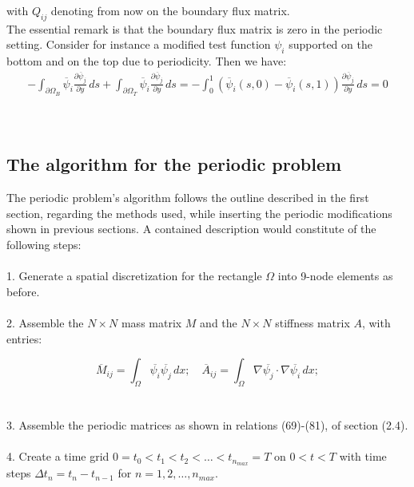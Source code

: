 \documentclass{article}
\begin{document}
with $Q_{ij}$ denoting from now on the boundary flux matrix.\\

The essential remark is that the boundary flux matrix is zero in the periodic setting. Consider for instance a modified test function $\psi_i$ supported on the bottom and on the top due to periodicity. Then we have:\\

\begin{align}
-\int_{\partial{\Omega_B}}\overline{\psi}_i \frac{\partial{\overline{\psi}_j}}{\partial y}\,ds +
\int_{\partial{\Omega_T}}\overline{\psi}_i \frac{\partial{\overline{\psi}_j}}{\partial y}\,ds = -
\int_{0}^{1}(\overline{\psi}_i(s,0)-\overline{\psi}_i(s,1))\frac{\partial{\overline{\psi}_j}}{\partial y}\,ds = 0
\end{align}\\\\

\subsection{The algorithm for the periodic problem}
The periodic problem's algorithm follows the outline described in the first section, regarding the methods used, while inserting the periodic modifications shown in previous sections.
A contained description would constitute of the following steps:\\\\

1. Generate a spatial discretization for the rectangle $\Omega$ into 9-node elements as before.\\\\

2. Assemble the $N \times N$ mass matrix $M$ and the $N \times N$ stiffness matrix $A$,  with entries:

\[
\overline{M}_{ij} = \int_{\Omega} \overline{\psi_i} \overline{\psi_j} \, dx; \quad \overline{A}_{ij} = \int_{\Omega} \nabla \overline{\psi_j} \cdot \nabla \overline{\psi_i} \, dx; 
\]\\\\

3. Assemble the periodic matrices as shown in relations (69)-(81), of section (2.4).\\\\

4. Create a time grid $0 = t_0 < t_1 < t_2 < \ldots < t_{n_{max}} = T$ on $0 < t < T$ with time steps $\Delta t_n = t_n - t_{n-1}$ for $n = 1, 2, \ldots, n_{max}$.\\\\
\end{document}
